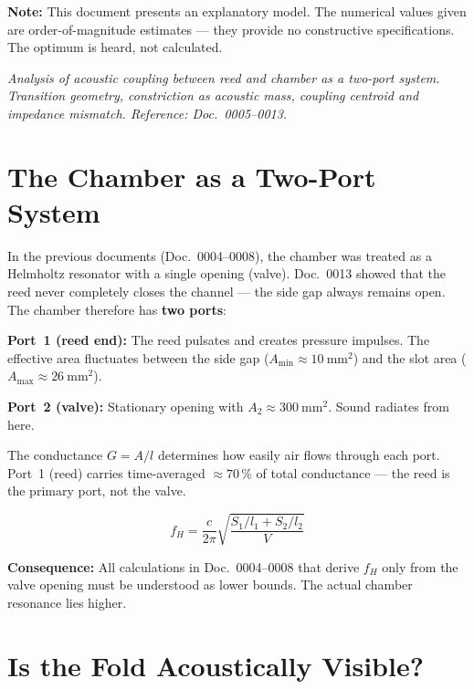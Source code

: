 \documentclass[11pt,a4paper]{article}
\begin{document}
\hbmaketitle
\begin{tcolorbox}[colframe=red!60!black, colback=red!5!white]
\textbf{Note:} This document presents an explanatory model.
The numerical values given are order-of-magnitude estimates ---
they provide no constructive specifications.
The optimum is heard, not calculated.
\end{tcolorbox}

\noindent\textit{Analysis of acoustic coupling between reed and chamber as a two-port system. Transition geometry, constriction as acoustic mass, coupling centroid and impedance mismatch.
Reference: Doc.~0005--0013.}

\section{The Chamber as a Two-Port System}

In the previous documents (Doc.~0004--0008), the chamber was treated as a Helmholtz resonator with a single opening (valve). Doc.~0013 showed that the reed never completely closes the channel --- the side gap always remains open. The chamber therefore has \textbf{two ports}:

\textbf{Port~1 (reed end):} The reed pulsates and creates pressure impulses. The effective area fluctuates between the side gap ($A_\mathrm{min} \approx 10~\mathrm{mm}^2$) and the slot area ($A_\mathrm{max} \approx 26~\mathrm{mm}^2$).

\textbf{Port~2 (valve):} Stationary opening with $A_2 \approx 300~\mathrm{mm}^2$. Sound radiates from here.

The conductance $G = A/l$ determines how easily air flows through each port. Port~1 (reed) carries time-averaged $\approx 70\,\%$ of total conductance --- the reed is the primary port, not the valve.

\begin{equation}
f_H = \frac{c}{2\pi}\sqrt{\frac{S_1/l_1 + S_2/l_2}{V}}
\end{equation}

\begin{tcolorbox}[colframe=keygreen, colback=green!5!white]
\textbf{Consequence:} All calculations in Doc.~0004--0008 that derive $f_H$ only from the valve opening must be understood as lower bounds. The actual chamber resonance lies higher.
\end{tcolorbox}

\section{Is the Fold Acoustically Visible?}
\end{document}
